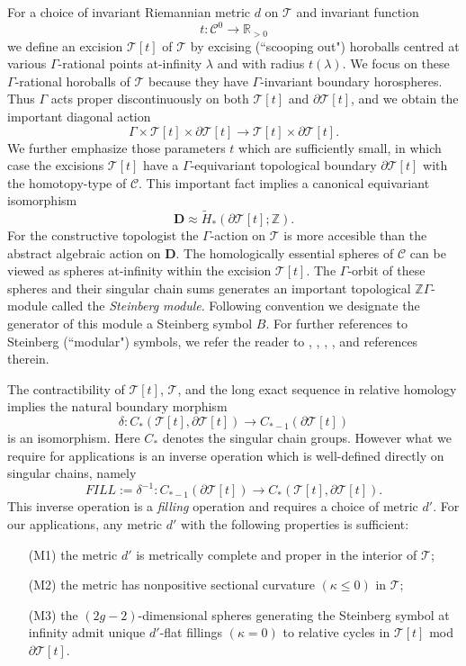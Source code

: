 \documentclass[12pt]{amsart}
\theoremstyle{definition}
\theoremstyle{remark}
\newcommand{\bR}{\mathbb{R}}
\newcommand{\bZ}{\mathbb{Z}}
\newcommand{\del}{\partial}
\newcommand{\bD}{\textbf{D}}
\newcommand{\sC}{\mathscr{C}}
\newcommand{\sT}{\mathscr{T}}
\begin{document}
For a choice of invariant Riemannian metric $d$ on $\sT$ and invariant function $$t: \sC^0 \to \bR_{>0}$$ we define an excision $\sT[t]$ of $\sT$ by excising (``scooping out") horoballs centred at various $\Gamma$-rational points at-infinity $\lambda$ and with radius $t(\lambda)$. We focus on these $\Gamma$-rational horoballs of $\sT$ because they have $\Gamma$-invariant boundary horospheres. Thus $\Gamma$ acts proper discontinuously on both $\sT[t]$ and $\del \sT[t]$, and we obtain the important diagonal action $$\Gamma \times \sT[t] \times \del \sT[t] \to \sT[t] \times \del \sT[t]. $$ We further emphasize those parameters $t$ which are sufficiently small, in which case the excisions $\sT[t]$  have a $\Gamma$-equivariant topological boundary $\del \sT[t]$ with the homotopy-type of $\sC$. This important fact implies a canonical equivariant isomorphism \begin{equation}\label{caniso}
\bD\approx \tilde{H}_*(\del \sT[t]; \bZ).
\end{equation} For the constructive topologist the $\Gamma$-action on $\sT$ is more accesible than the abstract algebraic action on $\bD$. The homologically essential spheres of $\sC$ can be viewed as spheres at-infinity within the excision $\sT[t]$. The $\Gamma$-orbit of these spheres and their singular chain sums generates an important topological $\bZ \Gamma$-module called the \emph{Steinberg module}. Following convention we designate the generator of this module a Steinberg symbol $B$. For further references to Steinberg (``modular") symbols, we refer the reader to \cite{manin}, \cite{AR}, \cite{AGM}, \cite{Stein}, \cite{Sol} and references therein. 

The contractibility of $\sT[t]$, $\sT$, and the long exact sequence in relative homology implies the natural boundary morphism $$\delta: C_*(\sT[t], \del \sT[t]) \to C_{*-1}(\del \sT[t])$$ is an isomorphism. Here $C_*$ denotes the singular chain groups. However what we require for applications is an inverse operation which is well-defined directly on singular chains, namely $$FILL:=\delta^{-1}: C_{*-1}(\del \sT[t]) \to C_*(\sT[t], \del \sT[t]).$$ This inverse operation is a \emph{filling} operation and requires a choice of metric $d'$. For our applications, any metric $d'$ with the following properties is sufficient:

\begin{itemize}
\item[(M1)] the metric $d'$ is metrically complete and proper in the interior of $\sT$;
\item[(M2)] the metric has nonpositive sectional curvature $(\kappa \leq 0)$ in $\sT$;
\item[(M3)] the $(2g-2)$-dimensional spheres generating the Steinberg symbol at infinity admit unique $d'$-flat fillings $(\kappa =0)$ to relative cycles in $\sT[t]$ mod $\del \sT[t]$.
\end{itemize}
\end{document}
